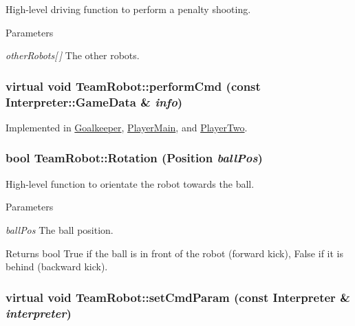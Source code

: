 High-\/level driving function to perform a penalty shooting. 


\begin{DoxyParams}{Parameters}
\item[{\em otherRobots\mbox{[}$\,$\mbox{]}}]The other robots. \end{DoxyParams}
\hypertarget{classTeamRobot_a9b84df51ca16a7203fdb6498ea6741da}{
\subsubsection[{performCmd}]{\setlength{\rightskip}{0pt plus 5cm}virtual void TeamRobot::performCmd (const {\bf Interpreter::GameData} \& {\em info})}}
\label{classTeamRobot_a9b84df51ca16a7203fdb6498ea6741da}


Implemented in \hyperlink{classGoalkeeper_ab850d0d2278730bebc5479f1a339a925}{Goalkeeper}, \hyperlink{classPlayerMain_af12a95c226ce973056681a138b55fb6c}{PlayerMain}, and \hyperlink{classPlayerTwo_a56d794b718c60092a324f312b8333eb9}{PlayerTwo}.

\hypertarget{classTeamRobot_aa1bb9ac05c067a68118c8646c8d71830}{
\subsubsection[{Rotation}]{\setlength{\rightskip}{0pt plus 5cm}bool TeamRobot::Rotation (Position {\em ballPos})}}
\label{classTeamRobot_aa1bb9ac05c067a68118c8646c8d71830}


High-\/level function to orientate the robot towards the ball. 


\begin{DoxyParams}{Parameters}
\item[{\em ballPos}]The ball position. \end{DoxyParams}
\begin{DoxyReturn}{Returns}
bool True if the ball is in front of the robot (forward kick), False if it is behind (backward kick). 
\end{DoxyReturn}
\hypertarget{classTeamRobot_a34c0fd6986c510d4025e5752b3c0e49a}{
\subsubsection[{setCmdParam}]{\setlength{\rightskip}{0pt plus 5cm}virtual void TeamRobot::setCmdParam (const {\bf Interpreter} \& {\em interpreter})}}
\label{classTeamRobot_a34c0fd6986c510d4025e5752b3c0e49a}



